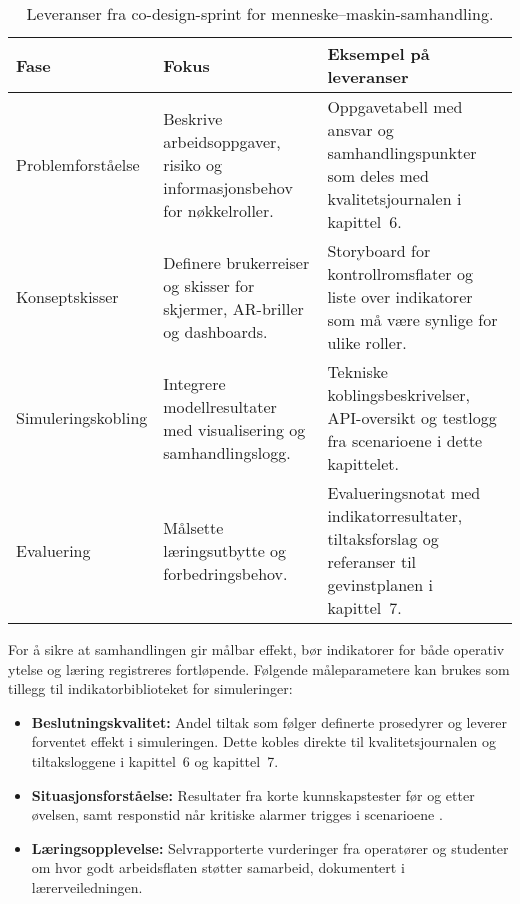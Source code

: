 \begin{table}[htbp]
    \centering
    \begin{tabular}{p{}p{}p{}}
        \toprule
        \textbf{Fase} & \textbf{Fokus} & \textbf{Eksempel på leveranser}\\
        \midrule
        Problemforståelse & Beskrive arbeidsoppgaver, risiko og informasjonsbehov for nøkkelroller. & Oppgavetabell med ansvar og samhandlingspunkter som deles med kvalitetsjournalen i kapittel~6.\\
        Konseptskisser & Definere brukerreiser og skisser for skjermer, AR-briller og dashboards. & Storyboard for kontrollromsflater og liste over indikatorer som må være synlige for ulike roller.\\
        Simuleringskobling & Integrere modellresultater med visualisering og samhandlingslogg. & Tekniske koblingsbeskrivelser, API-oversikt og testlogg fra scenarioene i dette kapittelet.\\
        Evaluering & Målsette læringsutbytte og forbedringsbehov. & Evalueringsnotat med indikatorresultater, tiltaksforslag og referanser til gevinstplanen i kapittel~7.\\
        \bottomrule
    \end{tabular}
    \caption{Leveranser fra co-design-sprint for menneske--maskin-samhandling.}
    \label{tab:kap04-codesign}
\end{table}

For å sikre at samhandlingen gir målbar effekt, bør indikatorer for både operativ ytelse og læring registreres fortløpende. Følgende måleparametere kan brukes som tillegg til indikatorbiblioteket for simuleringer:
\begin{itemize}
    \item \textbf{Beslutningskvalitet:} Andel tiltak som følger definerte prosedyrer og leverer forventet effekt i simuleringen. Dette kobles direkte til kvalitetsjournalen og tiltaksloggene i kapittel~6 og kapittel~7.
    \item \textbf{Situasjonsforståelse:} Resultater fra korte kunnskapstester før og etter øvelsen, samt responstid når kritiske alarmer trigges i scenarioene \citep{dsb2023ovelser}.
    \item \textbf{Læringsopplevelse:} Selvrapporterte vurderinger fra operatører og studenter om hvor godt arbeidsflaten støtter samarbeid, dokumentert i lærerveiledningen.
\end{itemize}

